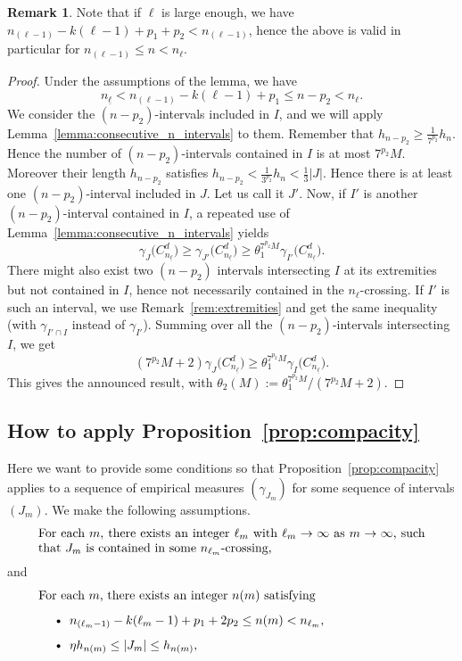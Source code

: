 \documentclass[10pt]{amsart}
\theoremstyle{definition}\newtheorem{defi}[theo]{Definition}\newtheorem{rema}[theo]{Remark}\newtheorem{exam}[theo]{Example}\newtheorem{exem}[theo]{Example}\newtheorem{nota}[theo]{Notation}
\newcommand{\egdef}{:=}
\newcommand{\cd}{C^{d}}
\newcommand{\lb}{\underline{\ell}}
\newcommand{\Gam}[1]{\gamma_{#1}\bigl(\cd_{n_{\lb}}\bigr)}
\begin{document}
\begin{rema}
Note that if $\ell$ is large enough, we have $n_{(\ell-1)} -k(\ell-1)+p_1+p_2<n_{(\ell-1)}$, hence the above is valid in particular for $n_{(\ell-1)}\le n < n_\ell$.
\end{rema}


\begin{proof}
Under the assumptions of the lemma, we have
\[
n_{\lb}< n_{(\ell-1)} - k(\ell-1) + p_1 \le n-p_2 < n_\ell.
\]
We consider the $(n-p_2)$-intervals included in $I$, and we will apply Lemma~\ref{lemma:consecutive_n_intervals} to them. Remember that $h_{n-p_2}\ge \frac{1}{7^{p_2}}h_n$. Hence the number of $(n-p_2)$-intervals contained in $I$ is at most $7^{p_2} M$. Moreover their length $h_{n-p_2}$ satisfies $h_{n-p_2}<\frac{1}{3^{p_2}}h_n<\frac{1}{3}|J|$. Hence there is at least one $(n-p_2)$-interval included in $J$. Let us call it $J'$. Now, if $I'$ is another $(n-p_2)$-interval contained in $I$, a repeated use of Lemma~\ref{lemma:consecutive_n_intervals} yields
\[
\Gam{J}\ge\Gam{J'} \ge \theta_1^{7^{p_2}M} \Gam{I'}.
\]
There might also exist two $(n-p_2)$ intervals intersecting $I$ at its extremities but not contained in $I$, hence not necessarily contained in the $n_\ell$-crossing. If $I'$ is such an interval, we use Remark~\ref{rem:extremities} and get the same inequality (with $\gamma_{I'\cap I}$ instead of $\gamma_{I'}$). Summing over all the $(n-p_2)$-intervals intersecting $I$, we get
\[
\left(7^{p_2}M +2\right)\Gam{J} \ge \theta_1^{7^{p_2}M} \Gam{I}.
\]
This gives the announced result, with $\theta_2(M)\egdef
\theta_1^{7^{p_2}M}/\left(7^{p_2}M+2\right)$.
\end{proof}

\subsection{How to apply Proposition~\ref{prop:compacity}}

Here we want to provide some conditions so that Proposition~\ref{prop:compacity} applies to a sequence of empirical measures $(\gamma_{J_m})$ for some sequence of intervals $(J_m)$. We make the following assumptions.
\begin{equation}\label{eq:assumptionJm1}
\begin{minipage}[t]{0.9\textwidth}
For each $m$, there exists an integer $\ell_m$ with $\ell_m\to\infty$ as $m\to\infty$, such that $J_m$ is contained in some $n_{\ell_m}$-crossing,
\end{minipage}
\end{equation}
and
\begin{equation}\label{eq:assumptionJm2}
\begin{minipage}[t]{0.9\textwidth}
For each $m$, there exists an integer $n(m)$ satisfying
\begin{itemize}
\item $n_{(\ell_m-1)}-k(\ell_m-1) + p_1+ 2p_2 \le n(m)< n_{\ell_m}$,
\item $\eta h_{n(m)}\le |J_m| \le h_{n(m)},$
\end{itemize}
\end{minipage}
\end{equation}
\end{document}
